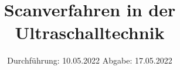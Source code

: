 

\subject{VERSUCH US2}
\title{Scanverfahren in der Ultraschalltechnik}
\date{%
  Durchführung: 10.05.2022
  \hspace{3em}
  Abgabe: 17.05.2022
}



\maketitle
\thispagestyle{empty}
\tableofcontents
\newpage






\printbibliography{}


